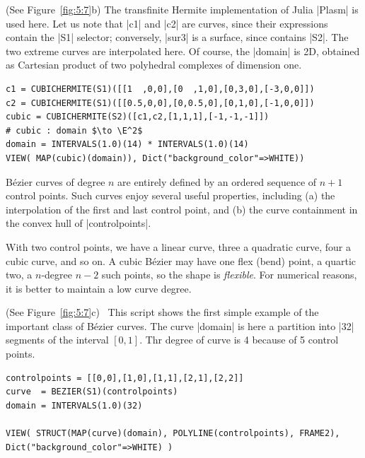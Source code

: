 \begin{coding}[Algebraic computation of FE = $\delta_1$]
{\begin{condition} (See Figure~\ref{fig:5:7}b)
\label{\ref{ex:5:4:3}}
The transfinite Hermite implementation of Julia |Plasm| is used here.
Let us note that |c1| and |c2| are curves, since their expressions contain the |S1| selector; conversely, |sur3| is a surface, since contains |S2|. The two extreme curves are interpolated here. Of course, the |domain| is 2D, obtained as Cartesian product of two polyhedral complexes of dimension one.
\begin{lstlisting}[language=JuliaLocal, style=julia, mathescape=true]
c1 = CUBICHERMITE(S1)([[1  ,0,0],[0  ,1,0],[0,3,0],[-3,0,0]])
c2 = CUBICHERMITE(S1)([[0.5,0,0],[0,0.5,0],[0,1,0],[-1,0,0]])
cubic = CUBICHERMITE(S2)([c1,c2,[1,1,1],[-1,-1,-1]])		
# cubic : domain $\to \E^2$
domain = INTERVALS(1.0)(14) * INTERVALS(1.0)(14)
VIEW( MAP(cubic)(domain)), Dict("background_color"=>WHITE))
\end{lstlisting}
\end{condition}



\begin{definition}
Bézier curves of degree $n$ are entirely defined by an ordered sequence of $n+1$ control points. Such curves enjoy several useful properties, including (a) the interpolation of the first and last control point, and (b) the curve containment in the convex hull of |controlpoints|.  
\end{definition}
With two control points, we have a linear curve, three a quadratic curve, four a cubic curve, and so on. A cubic Bézier may have one flex (bend) point, a quartic two, a $n$-degree $n-2$ such points, so the shape is \emph{flexible}. For numerical reasons, it is better to maintain a low curve degree.

\begin{condition} (See Figure~\ref{fig:5:7}c)\
\label{\ref{ex:5:4:4}}
This script shows the first simple example of the important class of Bézier curves.  The curve |domain| is here a partition into |32| segments of the interval $[0,1]$. Thr degree of curve is 4 because of 5 control points.
\begin{lstlisting}[language=JuliaLocal, style=julia, mathescape=true]
controlpoints = [[0,0],[1,0],[1,1],[2,1],[2,2]]
curve  = BEZIER(S1)(controlpoints)
domain = INTERVALS(1.0)(32)

VIEW( STRUCT(MAP(curve)(domain), POLYLINE(controlpoints), FRAME2), Dict("background_color"=>WHITE) ) 
\end{lstlisting}
\end{condition}

}
\end{coding}
